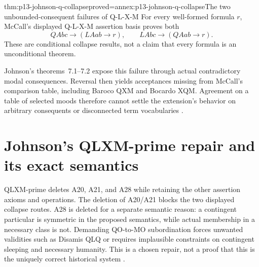 \begin{hbtheorem}{thm:p13-johnson-q-collapse}{proved=annex:p13-johnson-q-collapse}{The two unbounded-consequent failures of Q-L-X-M}
For every well-formed formula \(r\), McCall's displayed Q-L-X-M assertion
basis proves both
\[
 QAbc\to(LAab\to r),\qquad LAbc\to(QAab\to r).
\]
These are conditional collapse results, not a claim that every formula
is an unconditional theorem.
\end{hbtheorem}

Johnson's theorems~7.1--7.2 expose this failure through actual contradictory
modal consequences. Reversal then yields acceptances missing from McCall's
comparison table, including Baroco QXM and Bocardo XQM. Agreement on a
table of selected moods therefore cannot settle the extension's behavior on
arbitrary consequents or disconnected term vocabularies
\parencite[pp.~286--288]{Johnson2004ModalSyllogisms}.

\section{Johnson's QLXM-prime repair and its exact semantics}
\label{sec:p13-johnson-qlxm-prime}

QLXM-prime deletes A20, A21, and A28 while retaining the other assertion
axioms and operations. The deletion of A20/A21 blocks the two displayed
collapse routes. A28 is deleted for a separate semantic reason: a contingent
particular is symmetric in the proposed semantics, while actual membership
in a necessary class is not. Demanding QO-to-MO subordination forces
unwanted validities such as Disamis QLQ or requires implausible constraints
on contingent sleeping and necessary humanity. This is a chosen repair,
not a proof that this is the uniquely correct historical system
\parencite[pp.~288--295]{Johnson2004ModalSyllogisms}.

